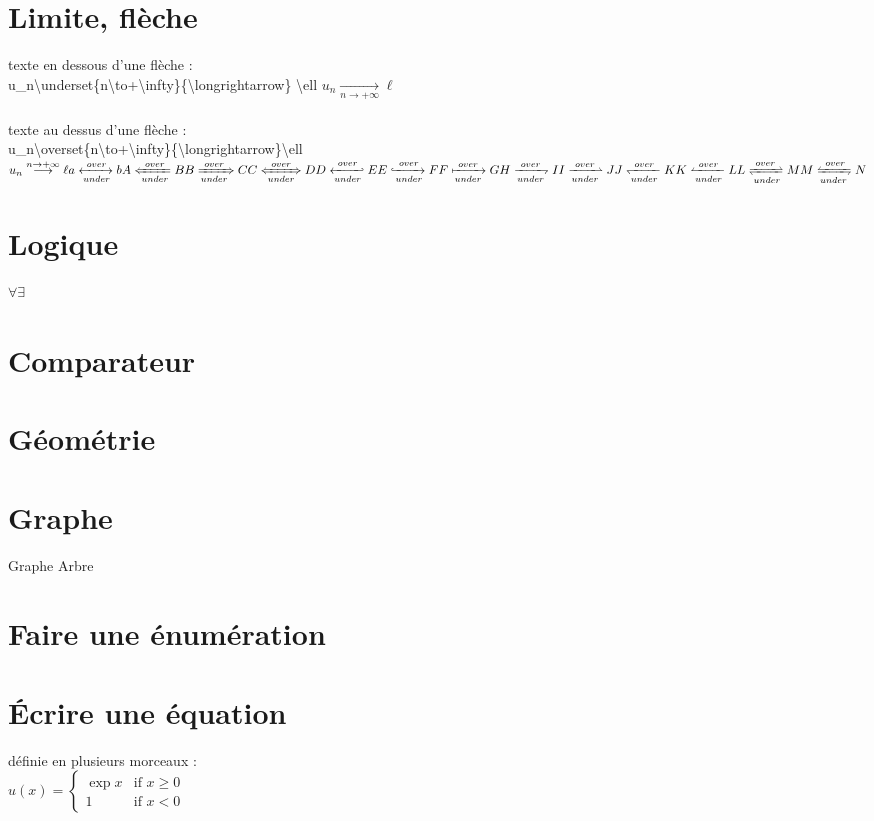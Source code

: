 \documentclass{article}
\begin{document}
\section{Limite, flèche}
texte en dessous d'une flèche :\\
u\_n\textbackslash underset\{n\textbackslash to+\textbackslash infty\}\{\textbackslash longrightarrow\} \textbackslash ell  $u_n\underset{n\to+\infty}{\longrightarrow}\ell$\\
    \\
    texte au dessus d'une flèche :\\
    u\_n\textbackslash overset\{n\textbackslash to+\textbackslash infty\}\{\textbackslash longrightarrow\}\textbackslash ell
$u_n\overset{n\to+\infty}{\longrightarrow}\ell\\
a \xleftrightarrow[under]{over} b\\
A \xLeftarrow[under]{over} B\\
B \xRightarrow[under]{over} C\\
%
C \xLeftrightarrow[under]{over} D\\
%
D \xhookleftarrow[under]{over} E\\
%
E \xhookrightarrow[under]{over} F\\
%
F \xmapsto[under]{over} G\\
%
H \xrightharpoondown[under]{over} I\\
%
I \xrightharpoonup[under]{over} J\\
%
J \xleftharpoondown[under]{over} K\\
%
K \xleftharpoonup[under]{over} L\\
%
L \xrightleftharpoons[under]{over} M\\
%
M \xleftrightharpoons[under]{over} N
$
\section{Logique}
$\forall
\exists$

\section{Comparateur}

\section{Géométrie}

\section{Graphe}
Graphe
Arbre
\section{Faire une énumération}

\section{\'Ecrire une équation}
définie en plusieurs morceaux :\\
$
u(x) =
\begin{cases}
\exp{x} & \text{if } x \geq 0 \\
1 & \text{if } x < 0
\end{cases}
$
\end{document}
